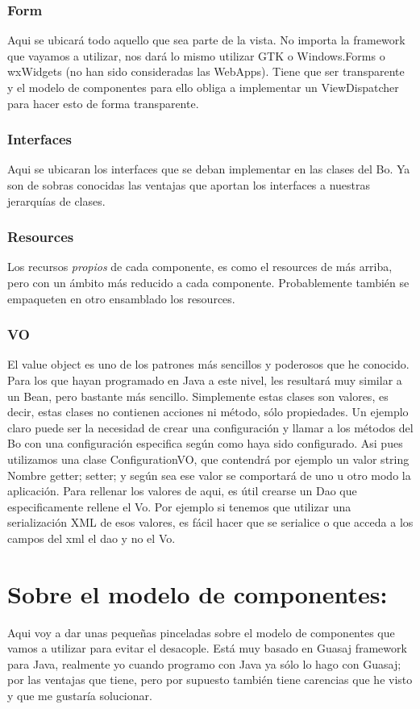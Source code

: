 \documentclass[a4paper]{article}
\begin{document}
\subsubsection{Form}
Aqui se ubicará todo aquello que sea parte de la vista.  No importa la framework
que vayamos a utilizar, nos dará lo mismo utilizar GTK o Windows.Forms o
wxWidgets (no han sido consideradas las WebApps).  Tiene que ser 
transparente y el modelo de componentes para ello
obliga a implementar un ViewDispatcher para hacer esto de forma transparente.
\subsubsection{Interfaces}
Aqui se ubicaran los interfaces que se deban implementar en las clases del Bo.
Ya son de sobras conocidas las ventajas que aportan los interfaces a nuestras
jerarquías de clases.
\subsubsection{Resources}
Los recursos \emph{propios} de cada componente, es como el resources de más
arriba, pero con un ámbito más reducido a cada componente.  Probablemente
también se empaqueten en otro ensamblado los resources.
\subsubsection{VO}
El value object es uno de los patrones más sencillos y poderosos que he
conocido.  Para los que hayan programado en Java a este nivel, les resultará muy
similar a un Bean, pero bastante más sencillo.
Simplemente estas clases son valores, es decir, estas clases no contienen
acciones ni método, sólo propiedades.
Un ejemplo claro puede ser la necesidad de crear una configuración y llamar a
los métodos del Bo con una configuración especifica según como haya sido
configurado.  Asi pues utilizamos una clase ConfigurationVO, que contendrá por
ejemplo un valor string Nombre getter; setter; y según sea ese valor se comportará
de uno u otro modo la aplicación.
Para rellenar los valores de aqui, es útil crearse un Dao que especificamente
rellene el Vo.  Por ejemplo si tenemos que utilizar una serialización XML de
esos valores, es fácil hacer que se serialice o que acceda a los campos del xml
el dao y no el Vo.
\appendix
\section{Sobre el modelo de componentes:}
Aqui voy a dar unas pequeñas pinceladas sobre el modelo de componentes que vamos
a utilizar para evitar el desacople.  Está muy basado en Guasaj framework para
Java, realmente yo cuando programo con Java ya sólo lo hago con Guasaj; por las
ventajas que tiene, pero por supuesto también tiene carencias que he visto y que
me gustaría solucionar.
\end{document}

